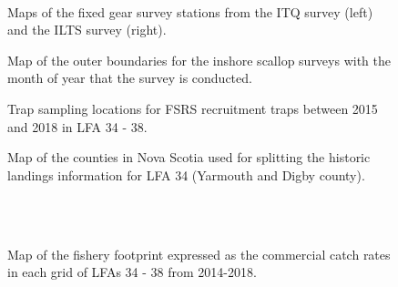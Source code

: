 \documentclass[11pt]{article}
\newcommand{\e}{/SpinDr/backup/bio_data/bio.lobster/figures/LFA3438Framework2019/} %
\begin{document}
     \begin{figure}
    \centering
        \\
        \caption{Maps of the fixed gear survey stations from the ITQ survey (left) and the ILTS survey (right).}
    \end{figure}

\begin{figure}
    \centering
        \caption{Map of the outer boundaries for the inshore scallop surveys with the month of year that the survey is conducted.}
    \end{figure}

   \begin{figure}
    \centering
        \caption{Trap sampling locations for FSRS recruitment traps between 2015 and 2018 in LFA 34 - 38.}

    \end{figure}


\begin{figure}
\centering
    \caption{Map of the counties in Nova Scotia used for splitting the historic landings information for LFA 34 (Yarmouth and Digby county).}

\end{figure}


  \begin{figure}
        \centering
    \\
                \\
        
         \caption{Map of the fishery footprint expressed as the commercial catch rates in each grid of LFAs 34 - 38 from 2014-2018.}
        \end{figure}
\end{document}
